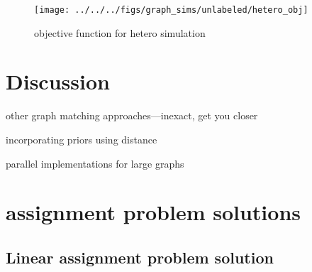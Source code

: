 \begin{figure}[!ht]
\centering \texttt{[image: ../../../figs/graph\_sims/unlabeled/hetero\_obj]}
\caption{objective function for hetero simulation}
\label{fig:sim1_params}
\end{figure}







\section{Discussion} %
\label{sec:discussion}


other graph matching approaches---inexact, get you closer

incorporating priors using distance

parallel implementations for large graphs


\clearpage
\appendix
\section{assignment problem solutions} %
\label{sec:assignment_problem_solutions}


\subsection{Linear assignment problem solution} %
\label{ssub:linear_assignment_problem_solution}

